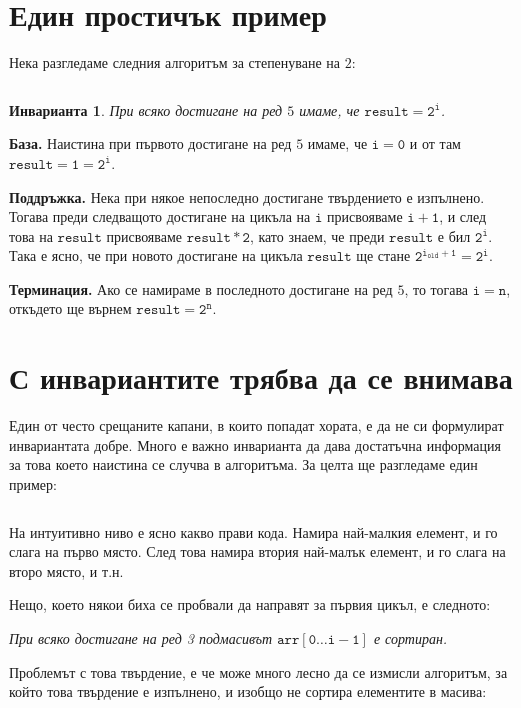 \documentclass{article}
\theoremstyle{definition}
\theoremstyle{plain}
\newtheorem*{invariant}{Инварианта}
\theoremstyle{remark}
\theoremstyle{definition}
\begin{document}
\section*{Един простичък пример}

Нека разгледаме следния алгоритъм за степенуване на $2$:
\inputminted[linenos]{c++}{algorithms/pow2.cpp}

\begin{invariant}
    При всяко достигане на ред $5$ имаме, че $\mathtt{result = 2^i}$.
\end{invariant}

\textbf{База.}
Наистина при първото достигане на ред $5$ имаме, че $\mathtt{i = 0}$ и от там $\mathtt{result = 1 = 2^i}$.

\textbf{Поддръжка.}
Нека при някое непоследно достигане твърдението е изпълнено.
Тогава преди следващото достигане на цикъла на $\mathtt{i}$ присвояваме $\mathtt{i + 1}$, и след това на $\mathtt{result}$ присвояваме $\mathtt{result * 2}$, като знаем, че преди $\mathtt{result}$ е бил $\mathtt{2^i}$.
Така е ясно, че при новото достигане на цикъла $\mathtt{result}$ ще стане $\mathtt{2^{i_{old} + 1} = 2^i}$.

\textbf{Терминация.}
Ако се намираме в последното достигане на ред $5$, то тогава $\mathtt{i = n}$, откъдето ще върнем $\mathtt{result = 2^n}$.

\pagebreak

\section*{С инвариантите трябва да се внимава}

Един от често срещаните капани, в които попадат хората, е да не си формулират инвариантата добре.
Много е важно инварианта да дава достатъчна информация за това което наистина се случва в алгоритъма.
За целта ще разгледаме един пример:
\inputminted[linenos]{c++}{algorithms/selection_sort.cpp}

На интуитивно ниво е ясно какво прави кода.
Намира най-малкия елемент, и го слага на първо място.
След това намира втория най-малък елемент, и го слага на второ място, и т.н.

Нещо, което някои биха се пробвали да направят за първия цикъл, е следното:
\begin{center}
    \textit{При всяко достигане на ред 3 подмасивът $\mathtt{arr[0 \dots i - 1]}$ е сортиран.}
\end{center}

Проблемът с това твърдение, е че може много лесно да се измисли алгоритъм, за който това твърдение е изпълнено, и изобщо не сортира елементите в масива:
\inputminted[linenos]{c++}{algorithms/trust_me_it_sorts.cpp}
\end{document}
